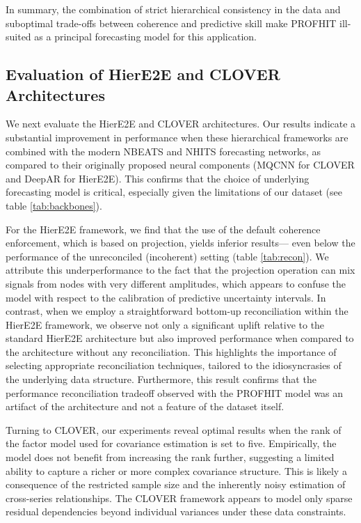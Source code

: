 \documentclass[letterpaper]{article}
\begin{document}
In summary, the combination of strict hierarchical consistency in the data and suboptimal trade-offs between coherence and predictive skill make PROFHIT ill-suited as a principal forecasting model for this application.

\subsection{Evaluation of HierE2E and CLOVER Architectures}

We next evaluate the HierE2E and CLOVER architectures. 
Our results indicate a substantial improvement in performance when these hierarchical frameworks are combined with the modern NBEATS and NHITS forecasting networks, as compared to their originally proposed neural components (MQCNN for CLOVER and DeepAR for HierE2E). 
This confirms that the choice of underlying forecasting model is critical, especially given the limitations of our dataset (see table \ref{tab:backbones}).

For the HierE2E framework, we find that the use of the default coherence enforcement, which is based on projection, yields inferior results— even below the performance of the unreconciled (incoherent) setting (table \ref{tab:recon}). 
We attribute this underperformance to the fact that the projection operation can mix signals from nodes with very different amplitudes, which appears to confuse the model with respect to the calibration of predictive uncertainty intervals. 
In contrast, when we employ a straightforward bottom-up reconciliation within the HierE2E framework, we observe not only a significant uplift relative to the standard HierE2E architecture but also improved performance when compared to the architecture without any reconciliation. 
This highlights the importance of selecting appropriate reconciliation techniques, tailored to the idiosyncrasies of the underlying data structure. 
Furthermore, this result confirms that the performance reconciliation tradeoff observed with the PROFHIT model was an artifact of the architecture and not a feature of the dataset itself. 

Turning to CLOVER, our experiments reveal optimal results when the rank of the factor model used for covariance estimation is set to five. 
Empirically, the model does not benefit from increasing the rank further, suggesting a limited ability to capture a richer or more complex covariance structure. 
This is likely a consequence of the restricted sample size and the inherently noisy estimation of cross-series relationships. 
The CLOVER framework appears to model only sparse residual dependencies beyond individual variances under these data constraints.
\end{document}
